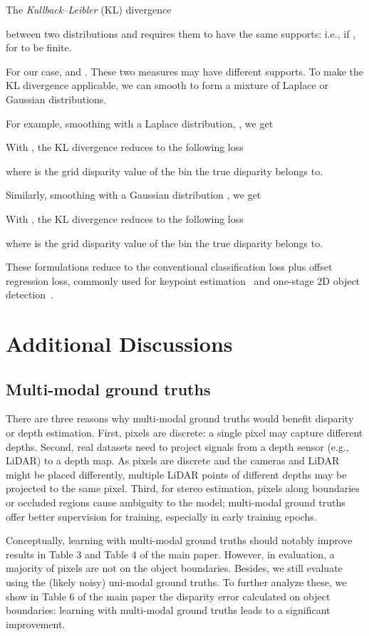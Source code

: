 \documentclass{article}
\newcommand{\ie}{i.e.\xspace}
\newcommand{\eg}{e.g.\xspace}
\begin{document}
The \emph{Kullback–Leibler} (KL) divergence 

between two distributions  and  requires them to have the same supports: \ie,  if , for  to be finite.

For our case,  and .
These two measures may have different supports. To make the KL divergence applicable, we can smooth  to form a mixture of Laplace or Gaussian distributions.

For example, smoothing  with a Laplace distribution, , we get

With , the KL divergence reduces to the following loss

where  is the grid disparity value of the bin the true disparity  belongs to.

Similarly, smoothing  with a Gaussian distribution , we get

With , the KL divergence reduces to the following loss

where  is the grid disparity value of the bin the true disparity  belongs to.

These formulations reduce to the conventional classification loss plus offset regression loss, commonly used for keypoint estimation~\cite{zhou2019objects,papandreou2017towards} and one-stage 2D object detection~\cite{zhou2019objects,redmon2016you,liu2016ssd,lin2017focal}.

\section{Additional Discussions}
\label{supsec:disc}

\subsection{Multi-modal ground truths} There are three reasons why multi-modal ground truths would benefit disparity or depth estimation. First, pixels are discrete: a single pixel may capture different depths. Second, real datasets need to project signals from a depth sensor (\eg, LiDAR) to a depth map. As pixels are discrete and the cameras and LiDAR might be placed differently, multiple LiDAR points of different depths may be projected to the same pixel. Third, for stereo estimation, pixels along boundaries or occluded regions cause ambiguity to the model; multi-modal ground truths offer better supervision for training, especially in early training epochs.

Conceptually, learning with multi-modal ground truths should notably improve results in Table 3 and Table 4 of the main paper. However, in evaluation, a majority of pixels are not on the object boundaries. Besides, we still evaluate using the (likely noisy) uni-modal ground truths. To further analyze these, we show in Table 6 of the main paper the disparity error calculated on object boundaries: learning with multi-modal ground truths leads to a significant improvement.
\end{document}
